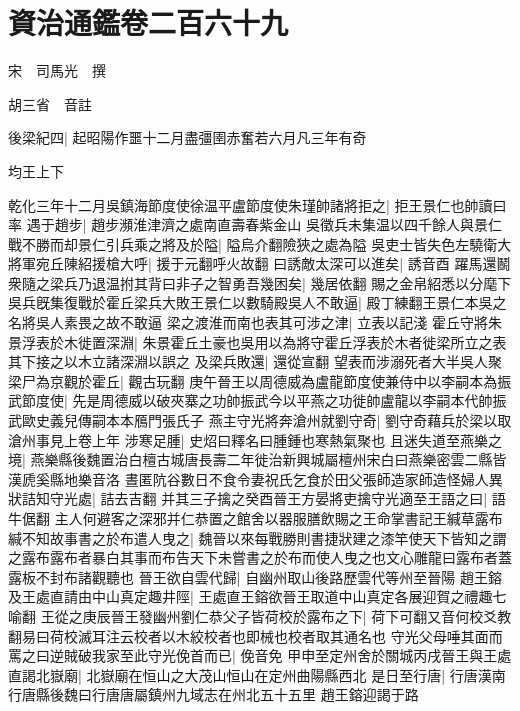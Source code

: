 \section{資治通鑑卷二百六十九}
宋　司馬光　撰

胡三省　音註

後梁紀四|{
	起昭陽作噩十二月盡彊圉赤奮若六月凡三年有奇}


均王上下

乾化三年十二月吳鎮海節度使徐温平盧節度使朱瑾帥諸將拒之|{
	拒王景仁也帥讀曰率}
遇于趙步|{
	趙步瀕淮津濟之處南直壽春紫金山}
吳徵兵未集温以四千餘人與景仁戰不勝而却景仁引兵乘之將及於隘|{
	隘烏介翻險狹之處為隘}
吳吏士皆失色左驍衛大將軍宛丘陳紹援槍大呼|{
	援于元翻呼火故翻}
曰誘敵太深可以進矣|{
	誘音酉}
躍馬還鬭衆隨之梁兵乃退温拊其背曰非子之智勇吾幾困矣|{
	幾居依翻}
賜之金帛紹悉以分麾下吳兵旣集復戰於霍丘梁兵大敗王景仁以數騎殿吳人不敢逼|{
	殿丁練翻王景仁本吳之名將吳人素畏之故不敢逼}
梁之渡淮而南也表其可涉之津|{
	立表以記淺}
霍丘守將朱景浮表於木徙置深淵|{
	朱景霍丘土豪也吳用以為將守霍丘浮表於木者徙梁所立之表其下接之以木立諸深淵以誤之}
及梁兵敗還|{
	還從宣翻}
望表而涉溺死者大半吳人聚梁尸為京觀於霍丘|{
	觀古玩翻}
庚午晉王以周德威為盧龍節度使兼侍中以李嗣本為振武節度使|{
	先是周德威以破夾寨之功帥振武今以平燕之功徙帥盧龍以李嗣本代帥振武歐史義兒傳嗣本本鴈門張氏子}
燕主守光將奔滄州就劉守奇|{
	劉守奇藉兵於梁以取滄州事見上卷上年}
涉寒足腫|{
	史炤曰釋名曰腫鍾也寒熱氣聚也}
且迷失道至燕樂之境|{
	燕樂縣後魏置治白檀古城唐長壽二年徙治新興城屬檀州宋白曰燕樂密雲二縣皆漢虒奚縣地樂音洛}
晝匿阬谷數日不食令妻祝氏乞食於田父張師造家師造怪婦人異狀詰知守光處|{
	詰去吉翻}
并其三子擒之癸酉晉王方晏將吏擒守光適至王語之曰|{
	語牛倨翻}
主人何避客之深邪并仁恭置之館舍以器服膳飲賜之王命掌書記王緘草露布緘不知故事書之於布遣人曳之|{
	魏晉以來每戰勝則書捷狀建之漆竿使天下皆知之謂之露布露布者暴白其事而布告天下未嘗書之於布而使人曳之也文心雕龍曰露布者蓋露板不封布諸觀聽也}
晉王欲自雲代歸|{
	自幽州取山後路歷雲代等州至晉陽}
趙王鎔及王處直請由中山真定趣井陘|{
	王處直王鎔欲晉王取道中山真定各展迎賀之禮趣七喻翻}
王從之庚辰晉王發幽州劉仁恭父子皆荷校於露布之下|{
	荷下可翻又音何校爻教翻易曰荷校滅耳注云校者以木絞校者也即械也校者取其通名也}
守光父母唾其面而罵之曰逆賊破我家至此守光俛首而已|{
	俛音免}
甲申至定州舍於關城丙戌晉王與王處直謁北嶽廟|{
	北嶽廟在恒山之大茂山恒山在定州曲陽縣西北}
是日至行唐|{
	行唐漢南行唐縣後魏曰行唐唐屬鎮州九域志在州北五十五里}
趙王鎔迎謁于路

